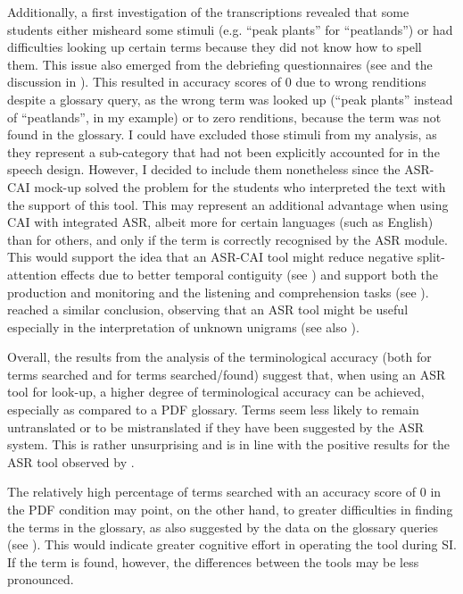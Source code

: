 Additionally, a first investigation of the transcriptions revealed that some students either misheard some stimuli (e.g. ``peak plants'' for ``peatlands'') or had difficulties looking up certain terms because they did not know how to spell them. This issue also emerged from the debriefing questionnaires (see  and the discussion in ). This resulted in accuracy scores of 0 due to wrong renditions despite a glossary query, as the wrong term was looked up (``peak plants'' instead of ``peatlands'', in my example) or to zero renditions, because the term was not found in the glossary. I could have excluded those stimuli from my analysis, as they represent a sub-category that had not been explicitly accounted for in the speech design. However, I decided to include them nonetheless since the ASR-CAI mock-up solved the problem for the students who interpreted the text with the support of this tool. This may represent an additional advantage when using CAI with integrated ASR, albeit more for certain languages (such as English) than for others, and only if the term is correctly recognised by the ASR module. This would support the idea that an ASR-CAI tool might reduce negative split-attention effects due to better temporal contiguity (see ) and support both the production and monitoring and the listening and comprehension tasks (see ). \citet{van_cauwenberghe_etude_2020} reached a similar conclusion, observing that an ASR tool might be useful especially in the interpretation of unknown unigrams (see also ).

Overall, the results from the analysis of the terminological accuracy (both for terms searched and for terms searched/found) suggest that, when using an ASR tool for look-up, a higher degree of terminological accuracy can be achieved, especially as compared to a PDF glossary. Terms seem less likely to remain untranslated or to be mistranslated if they have been suggested by the ASR system. This is rather unsurprising and is in line with the positive results for the ASR tool observed by \citet[105--109]{van_cauwenberghe_etude_2020}.

The relatively high percentage of terms searched with an accuracy score of 0 in the PDF condition may point, on the other hand, to greater difficulties in finding the terms in the glossary, as also suggested by the data on the glossary queries (see ). This would indicate greater cognitive effort in operating the tool during SI. If the term is found, however, the differences between the tools may be less pronounced.

